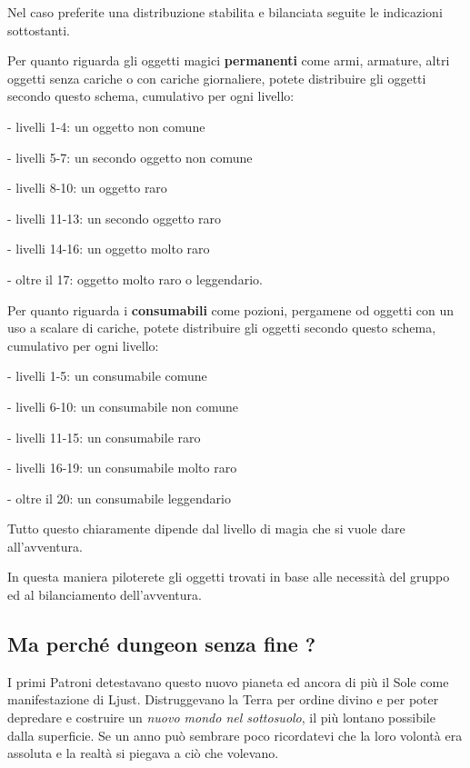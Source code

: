 \begin{multicols}{2}
Nel caso preferite una distribuzione stabilita e bilanciata seguite le indicazioni sottostanti.

Per quanto riguarda gli oggetti magici \textbf{permanenti} come armi, armature, altri oggetti senza cariche o con cariche giornaliere, potete distribuire gli oggetti secondo questo schema, cumulativo per ogni livello:

\medskip

- livelli 1-4: un oggetto non comune

- livelli 5-7: un secondo oggetto non comune

- livelli 8-10: un oggetto raro

- livelli 11-13: un secondo oggetto raro

- livelli 14-16: un oggetto molto raro

- oltre il 17: oggetto molto raro o leggendario.

\medskip

Per quanto riguarda i \textbf{consumabili} come pozioni, pergamene od oggetti con un uso a scalare di cariche, potete distribuire gli oggetti secondo questo schema, cumulativo per ogni livello:

\medskip

- livelli 1-5: un consumabile comune

- livelli 6-10: un consumabile non comune

- livelli 11-15: un consumabile raro

- livelli 16-19: un consumabile molto raro

- oltre il 20: un consumabile leggendario

\medskip

Tutto questo chiaramente dipende dal livello di magia che si vuole dare all'avventura.

In questa maniera piloterete gli oggetti trovati in base alle necessità del gruppo ed al bilanciamento dell'avventura.

\subsection*{Ma perché dungeon senza fine ?}

I primi Patroni detestavano questo nuovo pianeta ed ancora di più il Sole come manifestazione di Ljust.
Distruggevano la Terra per ordine divino e per poter depredare e costruire un \emph{nuovo mondo nel sottosuolo}, il più lontano possibile dalla superficie. Se un anno può sembrare poco ricordatevi che la loro volontà era assoluta e la realtà si piegava a ciò che volevano.


\end{multicols}
